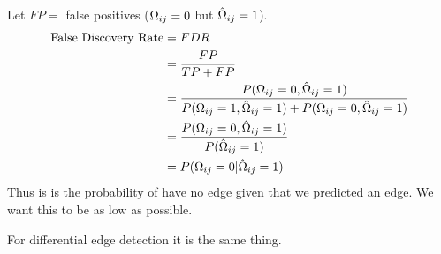\documentclass[12pt, leqno]{article}
\let\oldhat\hat
\renewcommand{\hat}[1]{\oldhat{{#1}}}
\def\om{\ensuremath\Omega}
\begin{document}
Let $FP = $ false positives (${\om}_{ij}
= 0$ but $\hat{\om}_{ij}
= 1$).
\begin{align*}
\text{False Discovery Rate} &= FDR \\
&= \frac{FP}{TP + FP}\\
&= \frac{P({\om}_{ij}
= 0,\hat{\om}_{ij}
= 1)}{P( {\om}_{ij}= 1, \hat{\om}_{ij}= 1)+P({\om}_{ij}
= 0,\hat{\om}_{ij}
= 1)}\\
&= \frac{P({\om}_{ij}
= 0,\hat{\om}_{ij}
= 1)}{P(\hat{\om}_{ij}=1)} \\
&= P(\om_{ij} = 0| \hat{\om}_{ij}=1)
\end{align*}
Thus is is the probability of have no edge given that we predicted an
edge. We want this to be as low as possible. 

For differential edge detection it is the same thing. 
\end{document}
